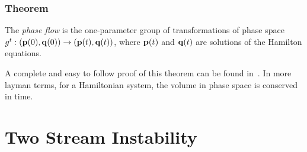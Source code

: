 \documentclass[12pt, class=report, crop=false]{standalone}
\begin{document}
\subsubsection{Theorem}
  The \textit{phase flow} is the one-parameter group of transformations of phase space
  \(g^t:(\vb{p}(0),\vb{q}(0))\rightarrow(\vb{p}(t),\vb{q}(t))\), where \(\vb{p}(t)\) and \(\vb{q}(t)\) are solutions of the Hamilton equations.
\newline

A complete and easy to follow proof of this theorem can be found in~\cite{arnoldMathematicalMethodsClassical1997}. In more layman terms, for a Hamiltonian system, the volume in phase space is conserved in time.

\section{Two Stream Instability}
\end{document}
